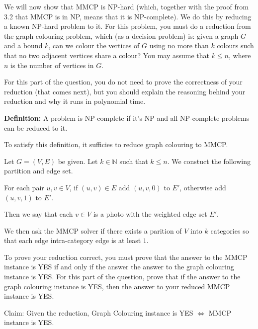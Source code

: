\begin{questions}
	\ifsolutions\fi

	\question[4] We will now show that MMCP is NP-hard (which, together with the proof from 3.2 that MMCP is in NP, means that it is NP-complete). We do this by reducing a known NP-hard problem to it. For this problem, you must do a reduction from the graph colouring problem, which (as a decision problem) is: given a graph $G$ and a bound $k$, can we colour the vertices of $G$ using no more than $k$ colours such that no two adjacent vertices share a colour? You may assume that $k \le n$, where $n$ is the number of vertices in $G$.

	For this part of the question, you do not need to prove the correctness of your reduction (that comes next), but you should explain the reasoning behind your reduction and why it runs in polynomial time.

	\ifsolutions\fi

	\begin{soln}
		\textbf{Definition:} A problem is NP-complete if it's NP and all NP-complete problems can be reduced to it.

		To satisfy this definition, it sufficies to reduce graph colouring to MMCP.

		Let \(G = (V, E)\) be given. Let \(k \in \mathbb{N}\) such that \(k \leq n\). We constuct the following partition and edge set.

		For each pair \(u, v \in V\), if \((u, v) \in E\) add \((u, v, 0)\) to \(E'\), otherwise add \((u, v, 1)\) to \(E'\).

		Then we say that each \(v \in V\) is a photo with the weighted edge set \(E'\).

		We then ask the MMCP solver if there exists a parition of \(V\) into \(k\) categories so that each edge intra-category edge is at least \(1\).
	\end{soln}

	\question[3] To prove your reduction correct, you must prove that the answer to the MMCP instance is YES if and only if the answer the answer to the graph colouring instance is YES. For this part of the question, prove that if the answer to the graph colouring instance is YES, then the answer to your reduced MMCP instance is YES.

	\ifsolutions\fi

	\begin{soln}
		Claim: Given the reduction, Graph Colouring instance is YES \(\iff\) MMCP instance is YES.


\end{soln}
\end{questions}
